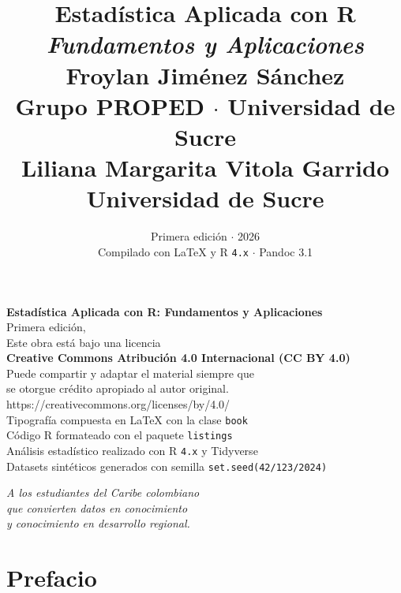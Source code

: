 \documentclass[
  10pt,           %
  twoside,        %
  openright       %
]{book}
\title{%
  \vspace{-2cm}
  {\Huge\bfseries Estadística Aplicada con R}\\[0.5cm]
  {\Large\itshape Fundamentos y Aplicaciones}\\[1cm]
  {\normalsize\upshape Froylan Jiménez Sánchez}\\[0.15cm]
  {\small Grupo PROPED $\cdot$ Universidad de Sucre}\\[0.5cm]
  {\normalsize\upshape Liliana Margarita Vitola Garrido}\\[0.15cm]
  {\small Universidad de Sucre}
}
\author{}
\date{%
  \small
  Primera edición $\cdot$ 2026\\[0.5cm]
  {\footnotesize Compilado con \LaTeX{} y R \texttt{4.x} $\cdot$ Pandoc 3.1}
}
\begin{document}
\frontmatter
\maketitle
\thispagestyle{empty}

\newpage
\thispagestyle{empty}
\vspace*{\fill}
\begin{center}
  \small
  \textbf{Estadística Aplicada con R: Fundamentos y Aplicaciones}\\[0.5cm]
  Primera edición, \the\year\\[1cm]
  Este obra está bajo una licencia\\
  \textbf{Creative Commons Atribución 4.0 Internacional (CC BY 4.0)}\\[0.3cm]
  Puede compartir y adaptar el material siempre que\\
  se otorgue crédito apropiado al autor original.\\[1cm]
  {\ttfamily https://creativecommons.org/licenses/by/4.0/}\\[2cm]
  Tipografía compuesta en \LaTeX{} con la clase \texttt{book}\\
  Código R formateado con el paquete \texttt{listings}\\
  Análisis estadístico realizado con R \texttt{4.x} y Tidyverse\\
  Datasets sintéticos generados con semilla \texttt{set.seed(42/123/2024)}
\end{center}
\vspace*{\fill}

\newpage
\thispagestyle{empty}
\vspace*{5cm}
\begin{flushright}
  \itshape
  A los estudiantes del Caribe colombiano\\
  que convierten datos en conocimiento\\
  y conocimiento en desarrollo regional.
\end{flushright}

\chapter*{Prefacio}
\end{document}
